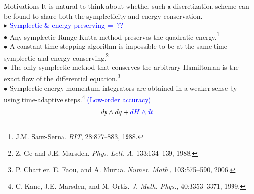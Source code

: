 \documentclass[10pt]{beamer}
\begin{document}
\begin{frame}{Motivations}
It is natural to think about whether such a discretization scheme can be found to share both the symplecticity and energy conservation.\\	
\vspace{2mm}
\textcolor[rgb]{0,0,1}{$\blacktriangleright$} \textcolor{blue}{Symplectic \& energy-preserving~=~??}\\
\vspace{2mm}
\quad\textcolor[rgb]{0,0,1}{$\bullet$} Any symplectic Runge-Kutta method preserves the quadratic energy.\footnote{J.M. Sanz-Serna. {\em BIT}, 28:877--883, 1988.}\\
\vspace{2mm}
\quad\textcolor[rgb]{0,0,1}{$\bullet$} A constant time stepping algorithm is impossible to be at the same time symplectic and energy conserving.\footnote{Z. Ge and J.E. Marsden. {\em Phys. Lett. A}, 133:134--139, 1988.}\\
\vspace{2mm}
\quad\textcolor[rgb]{0,0,1}{$\bullet$} The only symplectic method that conserves the arbitrary Hamiltonian is the exact flow of the differential equation.\footnote{P. Chartier, E. Faou, and A. Murua. {\em Numer. Math.}, 103:575--590, 2006.}\\
\vspace{2mm}
\quad\textcolor[rgb]{0,0,1}{$\bullet$} Symplectic-energy-momentum integrators are obtained in a weaker sense by using time-adaptive steps.\footnote{C. Kane, J.E. Marsden, and M. Ortiz. {\em J. Math. Phys.}, 40:3353--3371, 1999.} \textcolor{blue}{(Low-order accuracy)}
\begin{equation*}
dp\wedge dq+\textcolor{blue}{dH\wedge dt}
\end{equation*}
\end{frame}	
\end{document}
